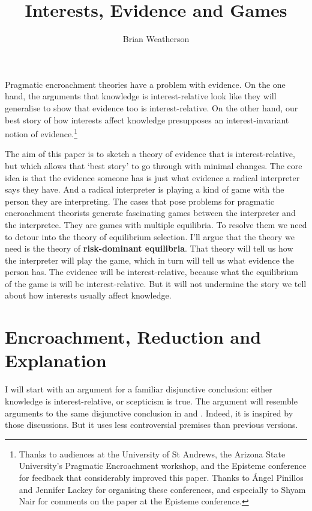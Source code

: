 \documentclass{article}
\title{Interests, Evidence and Games}
\author{Brian Weatherson}
\begin{document}
\maketitle

Pragmatic encroachment theories have a problem with evidence. On the one hand, the arguments that knowledge is interest-relative look like they will generalise to show that evidence too is interest-relative. On the other hand, our best story of how interests affect knowledge presupposes an interest-invariant notion of evidence.\footnote{Thanks to audiences at the University of St Andrews, the Arizona State University's Pragmatic Encroachment workshop, and the Episteme conference for feedback that considerably improved this paper. Thanks to Ángel Pinillos and Jennifer Lackey for organising these conferences, and especially to Shyam Nair for comments on the paper at the Episteme conference.}

The aim of this paper is to sketch a theory of evidence that is interest-relative, but which allows that `best story' to go through with minimal changes. The core idea is that the evidence someone has is just what evidence a radical interpreter says they have. And a radical interpreter is playing a kind of game with the person they are interpreting. The cases that pose problems for pragmatic encroachment theorists generate fascinating games between the interpreter and the interpretee. They are games with multiple equilibria. To resolve them we need to detour into the theory of equilibrium selection. I'll argue that the theory we need is the theory of \textbf{risk-dominant equilibria}. That theory will tell us how the interpreter will play the game, which in turn will tell us what evidence the person has. The evidence will be interest-relative, because what the equilibrium of the game is will be interest-relative. But it will not undermine the story we tell about how interests usually affect knowledge.

\section{Encroachment, Reduction and Explanation}
\label{encroachmentreductionandexplanation}

I will start with an argument for a familiar disjunctive conclusion: either knowledge is interest-relative, or scepticism is true. The argument will resemble arguments to the same disjunctive conclusion in \citet{Hawthorne2004} and \citet{FantlMcGrath2009}. Indeed, it is inspired by those discussions. But it uses less controversial premises than previous versions.
\end{document}
